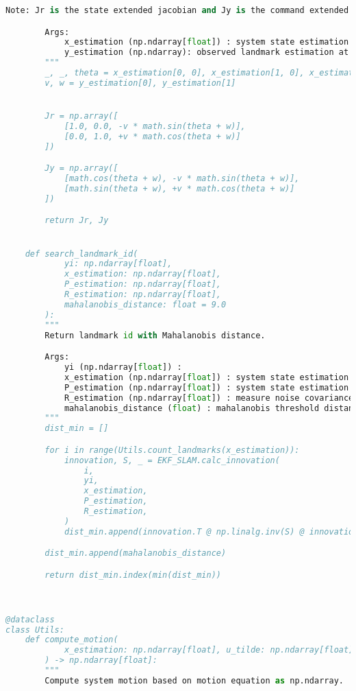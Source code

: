 \documentclass[../CSC_5RO12_TA_TP4.tex]{subfiles}
\begin{document}
\begin{scriptsize}
\begin{lstlisting}[language=Python]
        Note: Jr is the state extended jacobian and Jy is the command extended jacobian.

        Args:
            x_estimation (np.ndarray[float]) : system state estimation at instant k.
            y_estimation (np.ndarray): observed landmark estimation at instant k.
        """
        _, _, theta = x_estimation[0, 0], x_estimation[1, 0], x_estimation[2, 0]
        v, w = y_estimation[0], y_estimation[1]


        Jr = np.array([
            [1.0, 0.0, -v * math.sin(theta + w)],
            [0.0, 1.0, +v * math.cos(theta + w)]
        ])

        Jy = np.array([
            [math.cos(theta + w), -v * math.sin(theta + w)],
            [math.sin(theta + w), +v * math.cos(theta + w)]
        ])

        return Jr, Jy


    def search_landmark_id(
            yi: np.ndarray[float],
            x_estimation: np.ndarray[float],
            P_estimation: np.ndarray[float],
            R_estimation: np.ndarray[float],
            mahalanobis_distance: float = 9.0
        ):
        """
        Return landmark id with Mahalanobis distance.

        Args:
            yi (np.ndarray[float]) : 
            x_estimation (np.ndarray[float]) : system state estimation at instant k.
            P_estimation (np.ndarray[float]) : system state estimation covariance at instant k.
            R_estimation (np.ndarray[float]) : measure noise covariance matrix at instant k.
            mahalanobis_distance (float) : mahalanobis threshold distance. Default value is 9.0.
        """
        dist_min = []

        for i in range(Utils.count_landmarks(x_estimation)):
            innovation, S, _ = EKF_SLAM.calc_innovation(
                i,
                yi,
                x_estimation,
                P_estimation,
                R_estimation,
            )
            dist_min.append(innovation.T @ np.linalg.inv(S) @ innovation)

        dist_min.append(mahalanobis_distance)

        return dist_min.index(min(dist_min))



@dataclass
class Utils:
    def compute_motion(
            x_estimation: np.ndarray[float], u_tilde: np.ndarray[float], dt: float
        ) -> np.ndarray[float]:
        """
        Compute system motion based on motion equation as np.ndarray.


\end{lstlisting}
\end{scriptsize}
\end{document}

